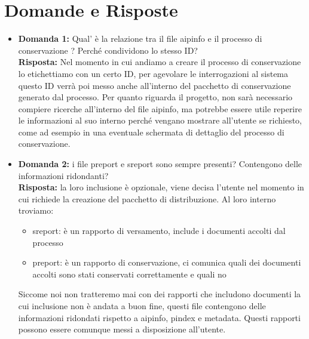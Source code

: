\documentclass[a4paper,12pt]{article}
\begin{document}
\section{Domande e Risposte} 
\begin{itemize}
    \item \textbf{Domanda 1:} Qual' è la relazione tra il file aipinfo e il processo di conservazione ? Perché condividono lo stesso ID?\\
    	\textbf{Risposta:}  Nel momento in cui andiamo a creare il processo di conservazione lo etichettiamo con un certo ID, per agevolare le interrogazioni al sistema questo ID verrà poi messo anche all'interno del pacchetto di conservazione generato dal processo. Per quanto riguarda il progetto, non sarà necessario compiere ricerche all'interno del file aipinfo, ma potrebbe essere utile reperire le informazioni al suo interno perché vengano mostrare all'utente se richiesto, come ad esempio in una eventuale schermata di dettaglio del processo di conservazione.

    \item \textbf{Domanda 2:} i file preport e sreport sono sempre presenti? Contengono delle informazioni ridondanti?
    \\ \textbf{Risposta:} la loro inclusione è opzionale, viene decisa l'utente nel momento in cui richiede la creazione del pacchetto di distribuzione. Al loro interno troviamo:
    \begin{itemize}
        \item sreport: è un rapporto di versamento, include i documenti accolti dal processo
        \item  preport: è un rapporto di conservazione, ci comunica quali dei documenti accolti sono stati conservati correttamente e quali no
    \end{itemize}
Siccome noi non tratteremo mai con dei rapporti che includono documenti la cui inclusione non è andata a buon fine, questi file contengono delle informazioni ridondati rispetto a aipinfo, pindex e metadata. Questi rapporti possono essere comunque messi a disposizione all'utente.


\end{itemize}
\end{document}
